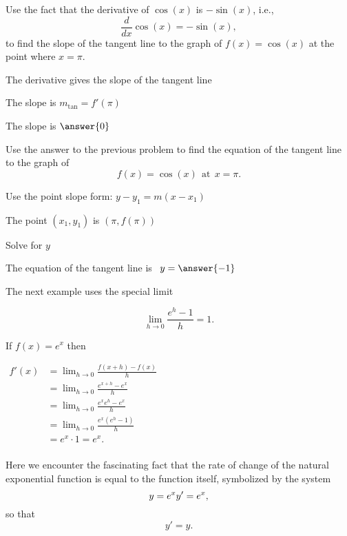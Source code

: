 \documentclass{ximera}
\begin{document}
\begin{problem} %
Use the fact that the derivative of $\cos(x)$ is $-\sin(x)$,
i.e., 
\[
\frac{d}{dx}\cos(x) = -\sin(x),
\]
to find the slope of the tangent line to the graph of 
$f(x) = \cos(x)$ at the point where $x = \pi$.\\
\begin{hint}
The derivative gives the slope of the tangent line
\end{hint}
\begin{hint}
The slope is $m_{\text{tan}} = f'(\pi)$
\end{hint}
The slope is $\answer{0}$
\end{problem}




\begin{problem} %
Use the answer to the previous problem to find the equation of the tangent line to the graph of 
\[
f(x) = \cos(x) \ \ \text{at} \ \ x=\pi.
\]
\begin{hint}
Use the point slope form: $y-y_1 = m(x-x_1)$
\end{hint}
\begin{hint}
The point $(x_1,y_1)$ is $(\pi, f(\pi))$
\end{hint}
\begin{hint}
Solve for $y$
\end{hint}
The equation of the tangent line is \ $y = \answer{-1}$
\end{problem}



The next example uses the special limit 

\[\lim_{h \to 0} \frac{e^h-1}{h} = 1.\]



\begin{example}[example 10]
If $f(x) = e^x$ then\\[-15pt]
\begin{center}
$\begin{aligned}
f'(x) &= \lim_{h \to 0} \frac{f(x+h)-f(x)}{h} \\[5pt]
&= \lim_{h \to 0}\frac{e^{x+h}-e^x}{h}\\[5pt]
&= \lim_{h \to 0} \frac{e^x e^h-e^x}{h}\\[5pt]
&= \lim_{h \to 0} \frac{e^x (e^h-1)}{h}\\[5pt]
&= e^x \cdot 1 = e^x.\\[-5pt]
\end{aligned}$
\end{center}
Here we encounter the fascinating fact that the rate of change of the natural exponential function
is equal to the function itself, symbolized by the system
\[
y=e^x\\
y' = e^x,
\]
so that 
\[
y' = y.
\]

\end{example}
\end{document}
